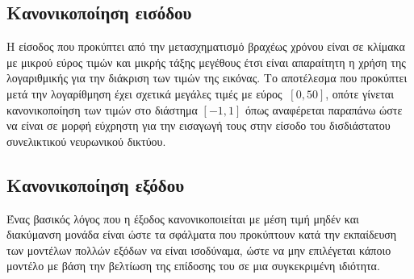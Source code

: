 \subsection{Κανονικοποίηση εισόδου}
Η είσοδος που προκύπτει από την μετασχηματισμό  βραχέως χρόνου είναι σε κλίμακα με μικρού εύρος τιμών και μικρής τάξης μεγέθους έτσι είναι απαραίτητη η χρήση της λογαριθμικής για την διάκριση των τιμών της εικόνας. Το αποτέλεσμα που προκύπτει μετά την λογαρίθμηση έχει σχετικά μεγάλες τιμές με εύρος $~[0,50]$, οπότε γίνεται κανονικοποίηση των τιμών στο διάστημα $[-1,1]$ όπως αναφέρεται παραπάνω ώστε να είναι σε μορφή εύχρηστη για την εισαγωγή τους στην είσοδο του δισδιάστατου συνελικτικού νευρωνικού δικτύου.
\subsection{Κανονικοποίηση εξόδου}
Ένας βασικός λόγος που η έξοδος κανονικοποιείται με μέση τιμή μηδέν και διακύμανση μονάδα είναι ώστε τα σφάλματα που προκύπτουν κατά την εκπαίδευση των μοντέλων πολλών εξόδων να είναι ισοδύναμα, ώστε να μην επιλέγεται κάποιο μοντέλο με βάση την βελτίωση της επίδοσης του σε μια συγκεκριμένη ιδιότητα.